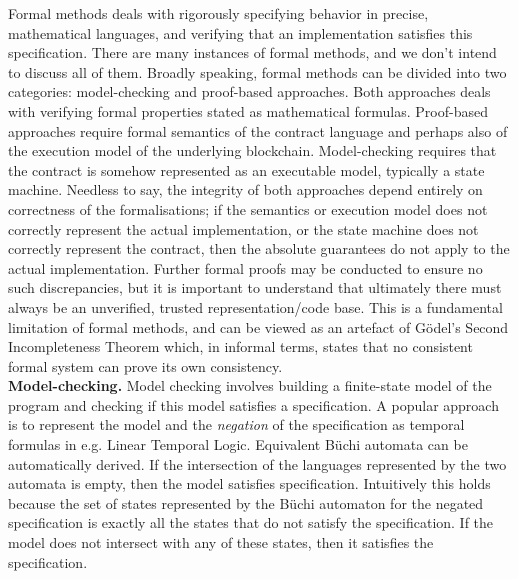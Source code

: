 \documentclass[twoside,11pt,openright]{report}
\begin{document}
Formal methods deals with rigorously specifying behavior in precise, mathematical languages, and verifying that an implementation satisfies this specification. There are many instances of formal methods, and we don't intend to discuss all of them. Broadly speaking, formal methods can be divided into two categories: model-checking and proof-based approaches. Both approaches deals with verifying formal properties stated as mathematical formulas. Proof-based approaches require formal semantics of the contract language and perhaps also of the execution model of the underlying blockchain. Model-checking requires that the contract is somehow represented as an executable model, typically a state machine. Needless to say, the integrity of both approaches depend entirely on correctness of the formalisations; if the semantics or execution model does not correctly represent the actual implementation, or the state machine does not correctly represent the contract, then the absolute guarantees do not apply to the actual implementation. Further formal proofs may be conducted to ensure no such discrepancies,  but it is important to understand that ultimately there must always be an unverified, trusted representation/code base. This is a fundamental limitation of formal methods, and can be viewed as an artefact of G\"odel's Second Incompleteness Theorem which, in informal terms, states that no consistent formal system can prove its own consistency.
\medskip\\
\textbf{Model-checking.} Model checking involves building a finite-state model of the program and checking if this model satisfies a specification. A popular approach is to represent the model and the \textit{negation} of the specification as temporal formulas in e.g. Linear Temporal Logic. Equivalent B\"uchi automata can be automatically derived. If the intersection of the languages represented by the two automata is empty, then the model satisfies specification. Intuitively this holds because the set of states represented by the B\"uchi automaton for the negated specification is exactly all the states that do not satisfy the specification. If the model does not intersect with any of these states, then it satisfies the specification.
\end{document}

